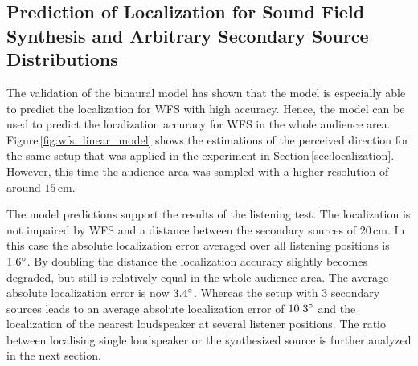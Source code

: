 \subsection{Prediction of Localization for Sound Field Synthesis and Arbitrary
Secondary Source Distributions}
\label{sec:prediction_of_localization_for_sound_field_synthesis_and_arbritrary_setups}
%
The validation of the binaural model has shown that the model is especially
able to predict the localization for \ac{WFS} with high accuracy. Hence, the model can
be used to predict the localization accuracy for \ac{WFS}
in the whole audience area. Figure\,\ref{fig:wfs_linear_model} shows the
estimations of the perceived direction for the same setup that was applied in
the experiment in Section\,\ref{sec:localization}. However, this time the audience area
was sampled with a higher resolution of around $15$\,cm.
%
\begin{figure*}
    \small
    \centering
    
    \caption{Model predictions of the perceived directions for a synthesized point
    source in the audience area. The three different linear secondary source
    distributions were all driven by \ac{WFS}~\protect\eqref{eq:d_wfs_ps_25D}.
    }
    \label{fig:wfs_linear_model}
\end{figure*}
%
The model predictions support the results of the listening test. The
localization is not impaired by \ac{WFS} and a distance between the secondary
sources of $20$\,cm. In this case the absolute localization error averaged over
all listening positions is $1.6^\circ$. 
By doubling the distance the localization accuracy slightly becomes
degraded, but still is relatively equal in the whole audience area. The
average absolute localization error is now $3.4^\circ$.
Whereas the setup with 3 secondary sources leads to an average absolute
localization error of $10.3^\circ$ and the localization of
the nearest loudspeaker at several listener positions.
The ratio between localising single loudspeaker or the synthesized source is
further analyzed in the next section.

